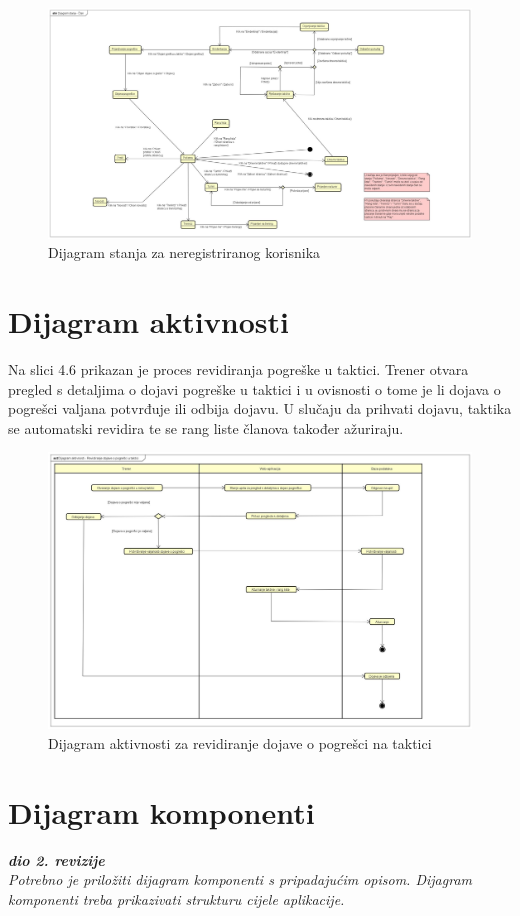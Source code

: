 			
			
			\begin{figure}[H]
				\centerfloat
				\includegraphics[scale=0.21]{dijagrami/dijagramstanjaclan2.jpg} %
				\caption{Dijagram stanja za neregistriranog korisnika}
				\label{fig:UC9}
			\end{figure}
			
			\eject
			
			
		\section{Dijagram aktivnosti}
		
		Na slici 4.6 prikazan je proces revidiranja pogreške u taktici. Trener otvara pregled s detaljima o dojavi pogreške u taktici i u ovisnosti o tome je li dojava o pogrešci valjana potvrđuje ili odbija dojavu. U slučaju da prihvati dojavu, taktika se automatski revidira te se rang liste članova također ažuriraju.
			
				\begin{figure}[H]
				\centerfloat
				\includegraphics[scale=0.25]{dijagrami/Dijagramaktivnosti.jpg} %
				\caption{Dijagram aktivnosti za revidiranje dojave o pogrešci na taktici}
				\label{fig:UC9}
			\end{figure}
			
			\eject
		\section{Dijagram komponenti}
		
			\textbf{\textit{dio 2. revizije}}\\
		
			 \textit{Potrebno je priložiti dijagram komponenti s pripadajućim opisom. Dijagram komponenti treba prikazivati strukturu cijele aplikacije.}